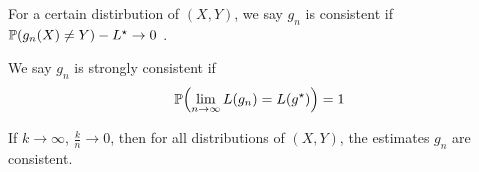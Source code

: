 \begin{defn}
  \label{defn:nearest_neighbour_classification:2}
  For a certain distirbution of $(X, Y)$, we say $g_{n}$ is consistent
  if $\Prob{g_{n}(X) \neq Y} - L^{\star} \rightarrow 0$ .

  We say $g_{n}$ is strongly consistent if
  \begin{equation}
    \label{eq:97}
    \Prob{\lim_{n \rightarrow \infty} L(g_{n}) = L(g^{\star})} = 1
  \end{equation}
\end{defn}

\begin{thm}
  \label{defn:nearest_neighbour_classification:3}
  If $k \rightarrow \infty$, $\frac{k}{n} \rightarrow 0$, then for all
  distributions of $(X, Y)$, the \knn estimates $g_{n}$ are consistent.
\end{thm}

